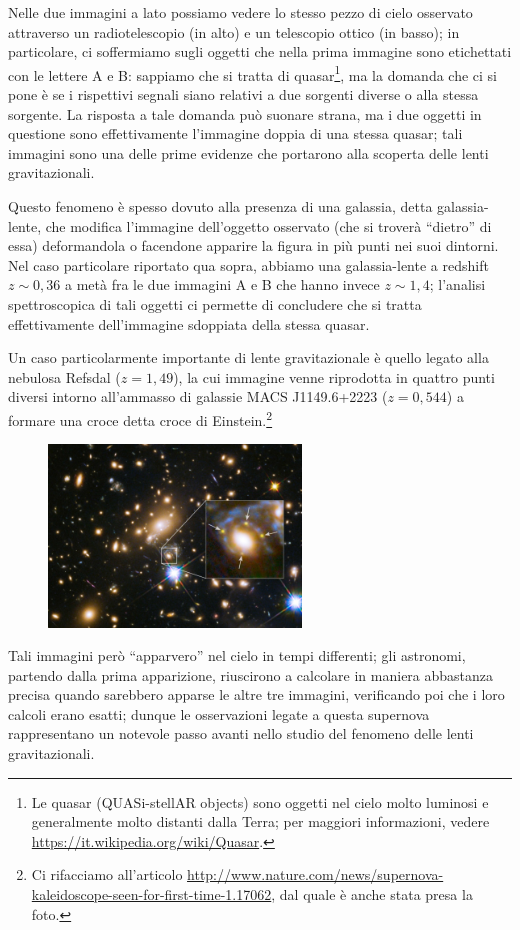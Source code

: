 \begin{minipage}{.60\textwidth}
	Nelle due immagini a lato possiamo vedere lo stesso pezzo di cielo osservato attraverso un radiotelescopio (in alto) e un telescopio ottico (in basso); in particolare, ci soffermiamo sugli oggetti che nella prima immagine sono etichettati con le lettere A e B: sappiamo che si tratta di quasar\footnote{Le quasar (QUASi-stellAR objects) sono oggetti nel cielo molto luminosi e generalmente molto distanti dalla Terra; per maggiori informazioni, vedere \url{https://it.wikipedia.org/wiki/Quasar}.}, ma la domanda che ci si pone è se i rispettivi segnali siano relativi a due sorgenti diverse o alla stessa sorgente. La risposta a tale domanda può suonare strana, ma i due oggetti in questione sono effettivamente l'immagine doppia di una stessa quasar; tali immagini sono una delle prime evidenze che portarono alla scoperta delle lenti gravitazionali.
\end{minipage}
Questo fenomeno è spesso dovuto alla presenza di una galassia, detta galassia-lente, che modifica l'immagine dell'oggetto osservato (che si troverà ``dietro'' di essa) deformandola o facendone apparire la figura in più punti nei suoi dintorni. Nel caso particolare riportato qua sopra, abbiamo una galassia-lente a redshift $z \sim 0,36$ a metà fra le due immagini A e B che hanno invece $z \sim 1,4$; l'analisi spettroscopica di tali oggetti ci permette di concludere che si tratta effettivamente dell'immagine sdoppiata della stessa quasar.

Un caso particolarmente importante  di lente gravitazionale è quello legato alla nebulosa Refsdal ($z=1,49$), la cui immagine venne riprodotta in quattro punti diversi intorno all'ammasso di galassie MACS J1149.6+2223 ($z=0,544$) a formare una croce detta croce di Einstein.\footnote{Ci rifacciamo all'articolo \url{http://www.nature.com/news/supernova-kaleidoscope-seen-for-first-time-1.17062}, dal quale è anche stata presa la foto.}

\begin{figure}[h!]
	\centering
	\includegraphics[width=0.6\textwidth]{Img/lente_grav.jpg}
\end{figure}
Tali immagini però ``apparvero'' nel cielo in tempi differenti; gli astronomi, partendo dalla prima apparizione, riuscirono a calcolare in maniera abbastanza precisa quando sarebbero apparse le altre tre immagini, verificando poi che i loro calcoli erano esatti; dunque le osservazioni legate a questa supernova rappresentano un notevole passo avanti nello studio del fenomeno delle lenti gravitazionali.


